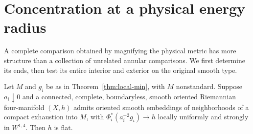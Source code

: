 \section{Concentration at a physical energy radius}\label{sec:energy-radius}

A complete comparison obtained by magnifying the physical metric has
more structure than a collection of unrelated annular comparisons.
We first determine its ends, then test its entire interior and exterior
on the original smooth type.

\begin{theorem}\label{thm:complete-limit}
Let \(M\) and \(g_i\) be as in Theorem~\ref{thm:local-min}, with \(M\)
nonstandard. Suppose \(a_i\downarrow0\) and a connected, complete,
boundaryless, smooth oriented Riemannian four-manifold \((X,h)\)
admits oriented smooth embeddings of neighborhoods of a compact
exhaustion into \(M\), with
\(\Phi_i^*(a_i^{-2}g_i)\to h\) locally uniformly and strongly in
\(W^{1,4}\). Then \(h\) is flat.
\end{theorem}


